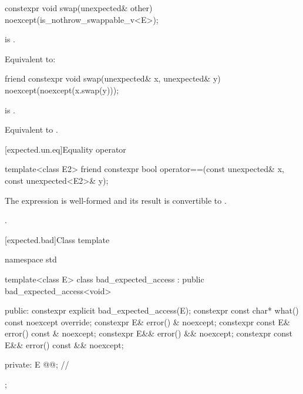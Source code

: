 %
\begin{itemdecl}
constexpr void swap(unexpected& other) noexcept(is_nothrow_swappable_v<E>);
\end{itemdecl}

\begin{itemdescr}
\pnum
\mandates
{} is .

\pnum
\effects
Equivalent to:
\end{itemdescr}

\begin{itemdecl}
friend constexpr void swap(unexpected& x, unexpected& y) noexcept(noexcept(x.swap(y)));
\end{itemdecl}

\begin{itemdescr}
\pnum
\constraints
{} is .

\pnum
\effects
Equivalent to .
\end{itemdescr}

[expected.un.eq]{Equality operator}

%
\begin{itemdecl}
template<class E2>
  friend constexpr bool operator==(const unexpected& x, const unexpected<E2>& y);
\end{itemdecl}

\begin{itemdescr}
\pnum
\mandates
The expression  is well-formed and
its result is convertible to .

\pnum
\returns
{}.
\end{itemdescr}

[expected.bad]{Class template }

%
\begin{codeblock}
namespace std {
  template<class E>
  class bad_expected_access : public bad_expected_access<void> {
  public:
    constexpr explicit bad_expected_access(E);
    constexpr const char* what() const noexcept override;
    constexpr E& error() & noexcept;
    constexpr const E& error() const & noexcept;
    constexpr E&& error() && noexcept;
    constexpr const E&& error() const && noexcept;

  private:
    E @@;             // \expos
  };
}
\end{codeblock}

